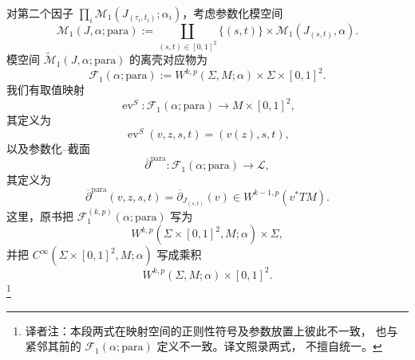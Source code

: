 对第二个因子 $\prod_i\mathcal M_1(J_{(\tau_i,t_i)};\alpha_i)$，考虑参数化模空间
\[
 \mathcal M_1(J,\alpha;\mathrm{para})
 :=\coprod_{(s,t)\in[0,1]^2}\{(s,t)\}\times\mathcal M_1(J_{(s,t)},\alpha).
\]
模空间 $\widetilde{\mathcal M}_1(J,\alpha;\mathrm{para})$ 的离壳对应物为
\[
 \mathcal F_1(\alpha;\mathrm{para})
 :=W^{k,p}(\Sigma,M;\alpha)\times\Sigma\times[0,1]^2.
\]
我们有取值映射
\[
 \operatorname{ev}^{S}:\mathcal F_1(\alpha;\mathrm{para})\longrightarrow M\times[0,1]^2,
\]
其定义为
\begin{equation}
 \operatorname{ev}^{S}(v,z,s,t)=(v(z),s,t),
 \label{eq:parameterized-sphere-evaluation}
\end{equation}
以及参数化\personCauchy{}--\personRiemann{}截面
\[
 \overline\partial^{\mathrm{para}}:
 \mathcal F_1(\alpha;\mathrm{para})\longrightarrow\mathcal L,
\]
其定义为
\[
 \overline\partial^{\mathrm{para}}(v,z,s,t)
 =\overline\partial_{J_{(s,t)}}(v)\in W^{k-1,p}(v^*TM).
\]
这里，原书把 $\mathcal F_1^{(k,p)}(\alpha;\mathrm{para})$ 写为
\[
 W^{k,p}(\Sigma\times[0,1]^2,M;\alpha)\times\Sigma,
\]
并把 $C^\infty(\Sigma\times[0,1]^2,M;\alpha)$ 写成乘积
\[
 W^{k,p}(\Sigma,M;\alpha)\times[0,1]^2.
\]
\footnote{译者注：本段两式在映射空间的正则性符号及参数放置上彼此不一致，
也与紧邻其前的 $\mathcal F_1(\alpha;\mathrm{para})$ 定义不一致。译文照录两式，
不擅自统一。}

